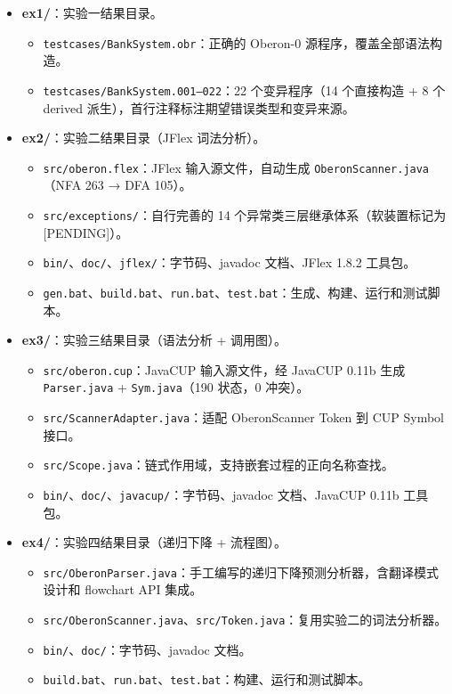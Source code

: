 \begin{itemize}
  \item \textbf{ex1/}：实验一结果目录。
    \begin{itemize}
    \item \texttt{testcases/BankSystem.obr}：正确的 Oberon-0 源程序，覆盖全部语法构造。
    \item \texttt{testcases/BankSystem.001--022}：22 个变异程序（14 个直接构造 + 8 个 derived 派生），首行注释标注期望错误类型和变异来源。
    \end{itemize}
  \item \textbf{ex2/}：实验二结果目录（JFlex 词法分析）。
    \begin{itemize}
    \item \texttt{src/oberon.flex}：JFlex 输入源文件，自动生成 \texttt{OberonScanner.java}（NFA 263 → DFA 105）。
    \item \texttt{src/exceptions/}：自行完善的 14 个异常类三层继承体系（软装置标记为 [PENDING]）。
    \item \texttt{bin/}、\texttt{doc/}、\texttt{jflex/}：字节码、javadoc 文档、JFlex 1.8.2 工具包。
    \item \texttt{gen.bat}、\texttt{build.bat}、\texttt{run.bat}、\texttt{test.bat}：生成、构建、运行和测试脚本。
    \end{itemize}
  \item \textbf{ex3/}：实验三结果目录（语法分析 + 调用图）。
    \begin{itemize}
    \item \texttt{src/oberon.cup}：JavaCUP 输入源文件，经 JavaCUP 0.11b 生成 \texttt{Parser.java} + \texttt{Sym.java}（190 状态，0 冲突）。
    \item \texttt{src/ScannerAdapter.java}：适配 OberonScanner Token 到 CUP Symbol 接口。
    \item \texttt{src/Scope.java}：链式作用域，支持嵌套过程的正向名称查找。
    \item \texttt{bin/}、\texttt{doc/}、\texttt{javacup/}：字节码、javadoc 文档、JavaCUP 0.11b 工具包。
    \end{itemize}
  \item \textbf{ex4/}：实验四结果目录（递归下降 + 流程图）。
    \begin{itemize}
    \item \texttt{src/OberonParser.java}：手工编写的递归下降预测分析器，含翻译模式设计和 flowchart API 集成。
    \item \texttt{src/OberonScanner.java}、\texttt{src/Token.java}：复用实验二的词法分析器。
    \item \texttt{bin/}、\texttt{doc/}：字节码、javadoc 文档。
    \item \texttt{build.bat}、\texttt{run.bat}、\texttt{test.bat}：构建、运行和测试脚本。
    \end{itemize}
\end{itemize}

